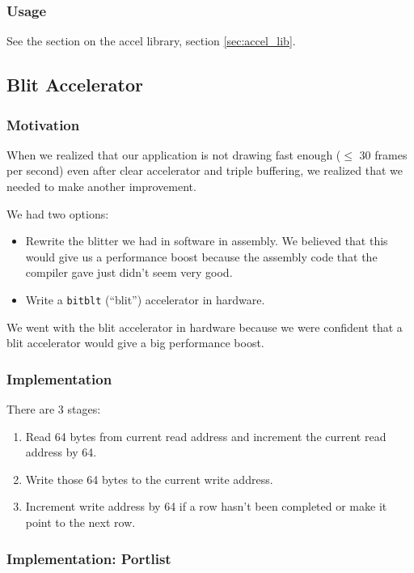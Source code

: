 \documentclass[10pt]{report}
\begin{document}
\subsubsection{Usage}

See the section on the accel library, section \ref{sec:accel_lib}.

\subsection{Blit Accelerator}

\subsubsection{Motivation}

When we realized that our application is not drawing fast enough ($\le$ 30
frames per second) even after clear accelerator and triple buffering, we
realized that we needed to make another improvement.

We had two options:
\begin{itemize}
\item{Rewrite the blitter we had in software in assembly. We believed that
this would give us a performance boost because the assembly code that the
compiler gave just didn't seem very good.}
\item{Write a \texttt{bitblt} (``blit'') accelerator in hardware.}
\end{itemize}

We went with the blit accelerator in hardware because we were confident that
a blit accelerator would give a big performance boost.

\subsubsection{Implementation}

There are 3 stages:
\begin{enumerate}
\item{Read 64 bytes from current read address and increment the current read
address by 64.}
\item{Write those 64 bytes to the current write address.}
\item{Increment write address by 64 if a row hasn't been completed or make
it point to the next row.}
\end{enumerate}

\subsubsection{Implementation: Portlist}
\end{document}
